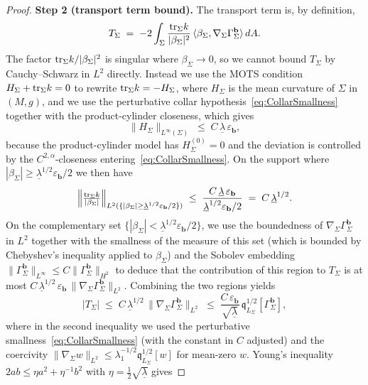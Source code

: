 \begin{proof}
\textbf{Step 2 (transport term bound).}
The transport term is, by definition,
\[
    T_\Sigma \;=\; -2\int_\Sigma\frac{\mathrm{tr}_\Sigma k}{|\beta_\Sigma|^2}\,\langle\beta_\Sigma,\nabla_\Sigma\Gamma_\Sigma^{\mathbf b}\rangle\,dA .
\]
The factor $\mathrm{tr}_\Sigma k/|\beta_\Sigma|^2$ is singular where $\beta_\Sigma\to0$, so we cannot bound $T_\Sigma$ by Cauchy--Schwarz in $L^2$ directly. Instead we use the MOTS condition $H_\Sigma+\mathrm{tr}_\Sigma k=0$ to rewrite $\mathrm{tr}_\Sigma k=-H_\Sigma$, where $H_\Sigma$ is the mean curvature of $\Sigma$ in $(M,g)$, and we use the perturbative collar hypothesis~\eqref{eq:CollarSmallness} together with the product-cylinder closeness, which gives
\begin{equation}\label{eq:MeanCurvatureSmallness}
    \|H_\Sigma\|_{L^\infty(\Sigma)}\;\le\;C\,\underline\lambda\,\varepsilon_{\mathbf b} ,
\end{equation}
because the product-cylinder model has $H_\Sigma^{(0)}=0$ and the deviation is controlled by the $C^{2,\alpha}$-closeness entering~\eqref{eq:CollarSmallness}. On the support where $|\beta_\Sigma|\ge\underline\lambda^{1/2}\varepsilon_{\mathbf b}/2$ we then have
\[
    \Bigl\|\tfrac{\mathrm{tr}_\Sigma k}{|\beta_\Sigma|}\Bigr\|_{L^2(\{|\beta_\Sigma|\ge\underline\lambda^{1/2}\varepsilon_{\mathbf b}/2\})}
    \;\le\;
    \frac{C\,\underline\lambda\,\varepsilon_{\mathbf b}}{\underline\lambda^{1/2}\varepsilon_{\mathbf b}/2}
    \;=\;C\,\underline\lambda^{1/2}.
\]
On the complementary set $\{|\beta_\Sigma|<\underline\lambda^{1/2}\varepsilon_{\mathbf b}/2\}$, we use the boundedness of $\nabla_\Sigma\Gamma_\Sigma^{\mathbf b}$ in $L^2$ together with the smallness of the measure of this set (which is bounded by Chebyshev's inequality applied to $\beta_\Sigma$) and the Sobolev embedding $\|\Gamma_\Sigma^{\mathbf b}\|_{L^\infty}\le C\|\Gamma_\Sigma^{\mathbf b}\|_{H^2}$ to deduce that the contribution of this region to $T_\Sigma$ is at most $C\,\underline\lambda^{1/2}\,\varepsilon_{\mathbf b}\,\|\nabla_\Sigma\Gamma_\Sigma^{\mathbf b}\|_{L^2}$. Combining the two regions yields
\begin{equation}\label{eq:TransportBound}
    |T_\Sigma|\;\le\;C\,\underline\lambda^{1/2}\,\|\nabla_\Sigma\Gamma_\Sigma^{\mathbf b}\|_{L^2}
    \;\le\;\frac{C\,\varepsilon_{\mathbf b}}{\sqrt{\underline\lambda}}\,\mathfrak q_{L_\Sigma}^{1/2}[\Gamma_\Sigma^{\mathbf b}] ,
\end{equation}
where in the second inequality we used the perturbative smallness~\eqref{eq:CollarSmallness} (with the constant in $C$ adjusted) and the coercivity $\|\nabla_\Sigma w\|_{L^2}\le\lambda_1^{-1/2}\mathfrak q_{L_\Sigma}^{1/2}[w]$ for mean-zero $w$. Young's inequality $2ab\le\eta a^2+\eta^{-1}b^2$ with $\eta=\tfrac12\sqrt{\underline\lambda}$ gives

\end{proof}
